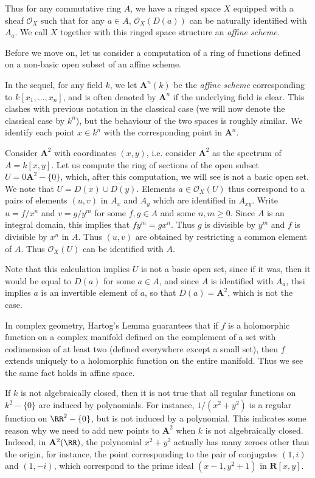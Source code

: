 Thus for any commutative ring $A$, we have a ringed space $X$ equipped with a sheaf $\mathcal{O}_X$ such that for any $a \in A$, $\mathcal{O}_X(D(a))$ can be naturally identified with $A_a$. We call $X$ together with this ringed space structure an \emph{affine scheme}.

Before we move on, let us consider a computation of a ring of functions defined on a non-basic open subset of an affine scheme.

\begin{example}
    In the sequel, for any field $k$, we let $\mathbf{A}^n(k)$ be the \emph{affine scheme} corresponding to $k[x_1,\dots,x_n]$, and is often denoted by $\mathbf{A}^n$ if the underlying field is clear. This clashes with previous notation in the classical case (we will now denote the classical case by $k^n$), but the behaviour of the two spaces is roughly similar. We identify each point $x \in k^n$ with the corresponding point in $\mathbf{A}^n$.

    Consider $\mathbf{A}^2$ with coordinates $(x,y)$, i.e. consider $\mathbf{A}^2$ as the spectrum of $A = k[x,y]$. Let us compute the ring of sections of the open subset $U = 0\mathbf{A}^2 - \{ 0 \}$, which, after this computation, we will see is not a basic open set. We note that $U = D(x) \cup D(y)$. Elements $a \in \mathcal{O}_X(U)$ thus correspond to a pairs of elements $(u,v)$ in $A_x$ and $A_y$ which are identified in $A_{xy}$. Write $u = f/x^n$ and $v = g/y^m$ for some $f,g \in A$ and some $n,m \geq 0$. Since $A$ is an integral domain, this implies that $fy^m = gx^n$. Thus $g$ is divisible by $y^m$ and $f$ is divisible by $x^n$ in $A$. Thus $(u,v)$ are obtained by restricting a common element of $A$. Thus $\mathcal{O}_X(U)$ can be identified with $A$.

    Note that this calculation implies $U$ is not a basic open set, since if it was, then it would be equal to $D(a)$ for some $a \in A$, and since $A$ is identified with $A_a$, thsi implies $a$ is an invertible element of $a$, so that $D(a) = \mathbf{A}^2$, which is not the case.

    In complex geometry, Hartog's Lemma guarantees that if $f$ is a holomorphic function on a complex manifold defined on the complement of a set with codimension of at least two (defined everywhere except a small set), then $f$ extends uniquely to a holomorphic function on the entire manifold. Thus we see the same fact holds in affine space.

    If $k$ is not algebraically closed, then it is not true that all regular functions on $k^2 - \{ 0 \}$ are induced by polynomials. For instance, $1/(x^2 + y^2)$ is a regular function on $\RR^2 - \{ 0 \}$, but is not induced by a polynomial. This indicates some reason why we need to add new points to $\mathbf{A}^2$ when $k$ is not algebraically closed. Indeeed, in $\mathbf{A}^2(\RR)$, the polynomial $x^2 + y^2$ actually has many zeroes other than the origin, for instance, the point corresponding to the pair of conjugates $(1,i)$ and $(1,-i)$, which correspond to the prime ideal $(x - 1, y^2 + 1)$ in $\mathbf{R}[x,y]$.
\end{example}

